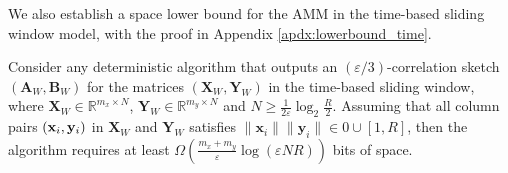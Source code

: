 We also establish a space lower bound for the AMM in the time-based sliding window model, with the proof in Appendix \ref{apdx:lowerbound_time}.
\begin{thm}\label{thm:lowerbound_time}
    Consider any deterministic algorithm that outputs an $(\varepsilon/3)$-correlation sketch  $(\mathbf{A}_W,\mathbf{B}_W)$ for the matrices $(\mathbf{X}_W,\mathbf{Y}_W)$ in the time-based sliding window, where $\mathbf{X}_W \in \mathbb{R}^{m_x \times N}$, $\mathbf{Y}_W \in \mathbb{R}^{m_y \times N}$ and $N \geq \frac{1}{2\varepsilon} \log_2{\frac{R}{2}}$. Assuming that all column pairs $({\bf{x}}_i,{\bf{y}}_i)$ in $\mathbf{X}_W$ and $\mathbf{Y}_W$ satisfies $\|\mathbf{x}_i\| \|\mathbf{y}_i\| \in 0\cup[1, R]$, then the algorithm requires at least $\Omega\left(\frac{m_x + m_y}{\varepsilon} \log(\varepsilon NR)\right)$ bits of space.
\end{thm}

